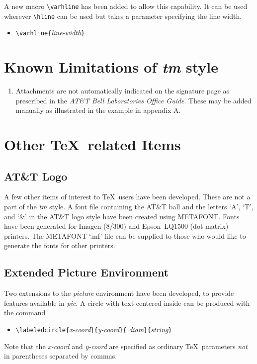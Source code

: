 A new macro \verb|\varhline| has been added to allow this capability.
It can be used wherever \verb|\hline| can be used but takes a
parameter specifying the line width.
\begin{itemize}
\item[]
\verb|\varhline{|{\it line-width}\verb|}|
\end{itemize}

\section{Known Limitations of {\it tm} style}
\begin{enumerate}
\item Attachments are not automatically indicated on the signature
page as prescribed in the {\it AT\&T Bell Laboratories Office Guide}.
These may be added manually as illustrated in the example in
appendix A.
\end{enumerate}
\section{Other \TeX\ related Items}
\subsection{AT\&T Logo}
A few other items of interest to \TeX\ users have been developed. 
These are not a part of the {\it tm} style.  A font file containing
the AT\&T ball and the letters `A', `T', and `\&' in the AT\&T logo
style have been created using METAFONT.  Fonts have been generated
for Imagen (8/300) and Epson\tm\ LQ1500 (dot-matrix) printers.  
The METAFONT `.mf' file can be supplied to those who would like 
to generate the fonts for other printers.
\subsection{Extended Picture Environment}
Two extensions to the {\it picture} environment have been
developed, to provide features available in {\it pic}.  A circle
with text centered inside can be produced with the command
\begin{itemize}
\item[]
\verb|\labeledcircle{|{\it x-coord}\verb|}{|{\it y-coord}\verb|}{|{\it
  diam}\verb|}{|{\it string}\verb|}|
\end{itemize}
Note that the {\it x-coord} and {\it y-coord} are specified as
ordinary \TeX\ parameters {\it not} in parentheses separated by
commas.  

